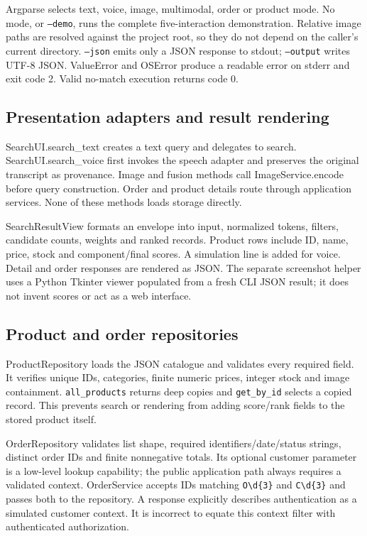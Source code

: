 \documentclass[11pt,a4paper]{article}
\begin{document}
Argparse selects text, voice, image, multimodal, order or product mode. No mode, or \texttt{--demo}, runs the complete five-interaction demonstration. Relative image paths are resolved against the project root, so they do not depend on the caller's current directory. \texttt{--json} emits only a JSON response to stdout; \texttt{--output} writes UTF-8 JSON. ValueError and OSError produce a readable error on stderr and exit code 2. Valid no-match execution returns code 0.

\subsection{Presentation adapters and result rendering}
SearchUI.search\_text creates a text query and delegates to search. SearchUI.search\_voice first invokes the speech adapter and preserves the original transcript as provenance. Image and fusion methods call ImageService.encode before query construction. Order and product details route through application services. None of these methods loads storage directly.

SearchResultView formats an envelope into input, normalized tokens, filters, candidate counts, weights and ranked records. Product rows include ID, name, price, stock and component/final scores. A simulation line is added for voice. Detail and order responses are rendered as JSON. The separate screenshot helper uses a Python Tkinter viewer populated from a fresh CLI JSON result; it does not invent scores or act as a web interface.

\subsection{Product and order repositories}
ProductRepository loads the JSON catalogue and validates every required field. It verifies unique IDs, categories, finite numeric prices, integer stock and image containment. \texttt{all\_products} returns deep copies and \texttt{get\_by\_id} selects a copied record. This prevents search or rendering from adding score/rank fields to the stored product itself.

OrderRepository validates list shape, required identifiers/date/status strings, distinct order IDs and finite nonnegative totals. Its optional customer parameter is a low-level lookup capability; the public application path always requires a validated context. OrderService accepts IDs matching \texttt{O\textbackslash d\{3\}} and \texttt{C\textbackslash d\{3\}} and passes both to the repository. A response explicitly describes authentication as a simulated customer context. It is incorrect to equate this context filter with authenticated authorization.
\end{document}
